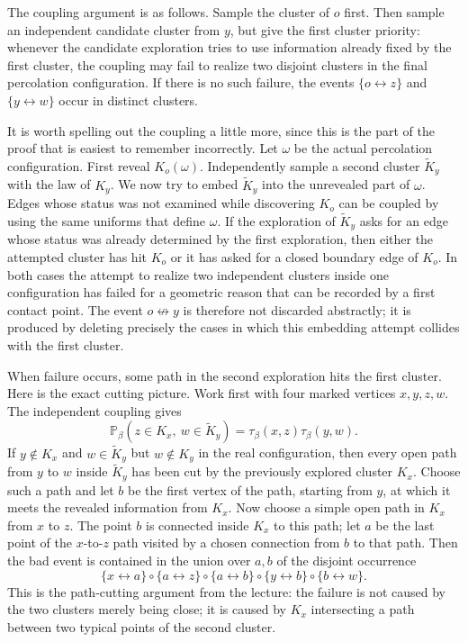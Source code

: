 \documentclass[11pt,reqno]{book}
\numberwithin{equation}{chapter}
\theoremstyle{plain}
\theoremstyle{definition}
\theoremstyle{remark}
\newcommand{\1}{\mathbf 1}
\begin{document}
The coupling argument is as follows. Sample the cluster of $o$ first. Then sample an independent candidate cluster from $y$, but give the first cluster priority: whenever the candidate exploration tries to use information already fixed by the first cluster, the coupling may fail to realize two disjoint clusters in the final percolation configuration. If there is no such failure, the events $\{o\leftrightarrow z\}$ and $\{y\leftrightarrow w\}$ occur in distinct clusters.

It is worth spelling out the coupling a little more, since this is the part of the proof that is easiest to remember incorrectly. Let \(\omega\) be the actual percolation configuration. First reveal \(K_o(\omega)\). Independently sample a second cluster \(\widetilde K_y\) with the law of \(K_y\). We now try to embed \(\widetilde K_y\) into the unrevealed part of \(\omega\). Edges whose status was not examined while discovering \(K_o\) can be coupled by using the same uniforms that define \(\omega\). If the exploration of \(\widetilde K_y\) asks for an edge whose status was already determined by the first exploration, then either the attempted cluster has hit \(K_o\) or it has asked for a closed boundary edge of \(K_o\). In both cases the attempt to realize two independent clusters inside one configuration has failed for a geometric reason that can be recorded by a first contact point. The event \(o\not\leftrightarrow y\) is therefore not discarded abstractly; it is produced by deleting precisely the cases in which this embedding attempt collides with the first cluster.

When failure occurs, some path in the second exploration hits the first cluster.
Here is the exact cutting picture. Work first with four marked vertices
\(x,y,z,w\). The independent coupling gives
\[
  \mathbb P_\beta(z\in K_x,\ w\in \widetilde K_y)
  =
  \tau_\beta(x,z)\tau_\beta(y,w).
\]
If \(y\notin K_x\) and \(w\in\widetilde K_y\) but \(w\notin K_y\) in the
real configuration, then every open path from \(y\) to \(w\) inside
\(\widetilde K_y\) has been cut by the previously explored cluster \(K_x\).
Choose such a path and let \(b\) be the first vertex of the path, starting
from \(y\), at which it meets the revealed information from \(K_x\). Now
choose a simple open path in \(K_x\) from \(x\) to \(z\). The point \(b\) is
connected inside \(K_x\) to this path; let \(a\) be the last point of the
\(x\)-to-\(z\) path visited by a chosen connection from \(b\) to that path.
Then the bad event is contained in the union over \(a,b\) of the disjoint
occurrence
\[
  \{x\leftrightarrow a\}
  \circ
  \{a\leftrightarrow z\}
  \circ
  \{a\leftrightarrow b\}
  \circ
  \{y\leftrightarrow b\}
  \circ
  \{b\leftrightarrow w\}.
\]
This is the path-cutting argument from the lecture: the failure is not caused
by the two clusters merely being close; it is caused by \(K_x\) intersecting
a path between two typical points of the second cluster.
\end{document}
